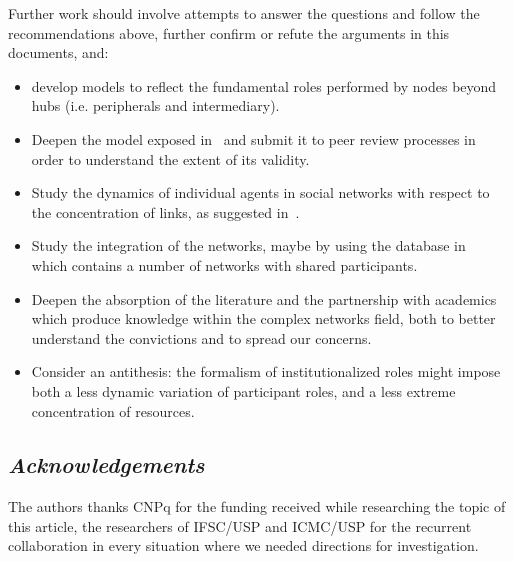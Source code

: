 \documentclass[12pt,fleqn]{article}
\begin{document}
Further work should involve attempts to answer the questions and follow the recommendations above,
further confirm or refute the arguments in this documents, and:
\begin{itemize}
	\item develop models to reflect the fundamental roles performed by nodes beyond hubs (i.e.
		peripherals and intermediary).
	\item Deepen the model exposed in~\cite{fabbri3} and submit it to peer review processes in order
		to understand the extent of its validity.
	\item Study the dynamics of individual agents in social networks with respect to the concentration of links,
		as suggested in~\cite{fabbri1,fabbri2,versinus}.
	\item Study the integration of the networks, maybe by using the database in~\cite{losd} which
		contains a number of networks with shared participants.
	\item Deepen the absorption of the literature and the partnership with academics which produce
		knowledge within the complex networks field, both to better understand the convictions
		and to spread our concerns.
	\item Consider an antithesis: the formalism of institutionalized roles
		might impose both a less dynamic variation of participant roles,
		and a less extreme concentration of resources.
\end{itemize}

\subsection*{\textit{Acknowledgements}}
The authors thanks CNPq for the funding received while researching the topic of this article,
the researchers of IFSC/USP and ICMC/USP for the recurrent collaboration in every situation
where we needed directions for investigation.
\end{document}

